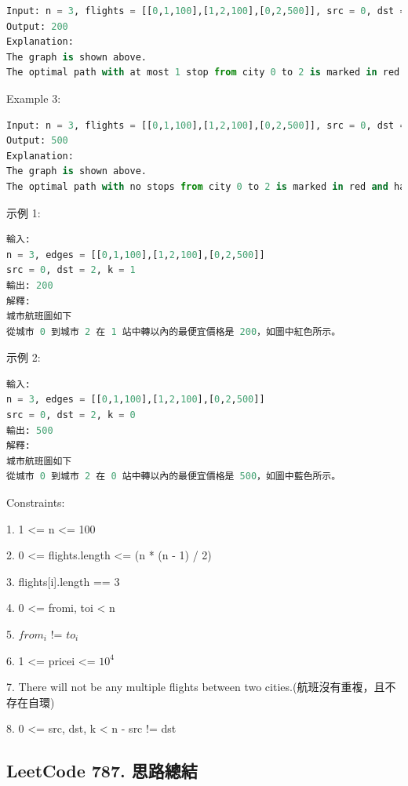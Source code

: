 \documentclass[10pt,UTF8]{ctexart}
\begin{document}
\begin{lstlisting}[language={python}]
Input: n = 3, flights = [[0,1,100],[1,2,100],[0,2,500]], src = 0, dst = 2, k = 1
Output: 200
Explanation:
The graph is shown above.
The optimal path with at most 1 stop from city 0 to 2 is marked in red and has cost 100 + 100 = 200.
\end{lstlisting}

Example 3:

\begin{lstlisting}[language={python}]
Input: n = 3, flights = [[0,1,100],[1,2,100],[0,2,500]], src = 0, dst = 2, k = 0
Output: 500
Explanation:
The graph is shown above.
The optimal path with no stops from city 0 to 2 is marked in red and has cost 500.
\end{lstlisting}

示例 1:

\begin{lstlisting}[language={python}]
輸入: 
n = 3, edges = [[0,1,100],[1,2,100],[0,2,500]]
src = 0, dst = 2, k = 1
輸出: 200
解釋: 
城市航班圖如下
從城市 0 到城市 2 在 1 站中轉以內的最便宜價格是 200，如圖中紅色所示。
\end{lstlisting}

示例 2:

\begin{lstlisting}[language={python}]
輸入: 
n = 3, edges = [[0,1,100],[1,2,100],[0,2,500]]
src = 0, dst = 2, k = 0
輸出: 500
解釋: 
城市航班圖如下
從城市 0 到城市 2 在 0 站中轉以內的最便宜價格是 500，如圖中藍色所示。
\end{lstlisting}


Constraints:

1. 1 <= n <= 100

2. 0 <= flights.length <= (n * (n - 1) / 2)

3. flights[i].length == 3

4. 0 <= fromi, toi < n

5. $from_i$ != $to_i$

6. 1 <= pricei <= $10^4$

7. There will not be any multiple flights between two cities.(航班沒有重複，且不存在自環)

8. 0 <= src, dst, k < n
- src != dst



\subsection{LeetCode 787. 思路總結}
\end{document}
